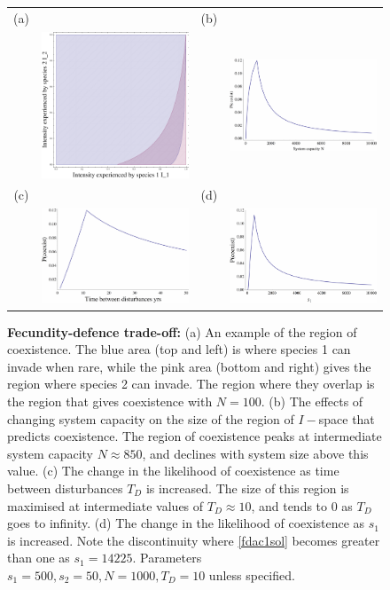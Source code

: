 \documentclass[preprint,10pt,reqno]{amsart}
\begin{document}
\begin{figure}[htbp]
\begin{tabular}{cccc}
(a)&&(b)&\\
&\includegraphics[width=2in]{fdtotdis10.pdf}&&\includegraphics[width=2in]{fdtointwN.pdf} \\
(c)&&(d)&\\
&\includegraphics[width=2in]{fdtointwTd.pdf}&&\includegraphics[width=2in]{fdtointws1.pdf}
\end{tabular}
\caption{\textbf{Fecundity-defence trade-off:} (a) An example of the region of coexistence. The blue area (top and left) is where species 1 can invade when rare, while the pink area (bottom and right) gives the region where species 2 can invade. The region where they overlap is the region that gives coexistence with $N=100$. (b) The effects of changing system capacity on the size of the region of $I-$space that predicts coexistence. The region of coexistence peaks at intermediate system capacity $N\approx 850$, and declines with system size above this value. (c) The change in the likelihood of coexistence as time between disturbances $T_D$ is increased. The size of this region is maximised at intermediate values of $T_D \approx 10$, and tends to 0 as $T_D$ goes to infinity. (d) The change in the likelihood of coexistence as $s_1$ is increased. Note the discontinuity where \eqref{fdac1sol} becomes greater than one as $s_1=14225$.  Parameters $s_1=500,s_2=50,N=1000,T_D=10$ unless specified.}
\label{fd}
\end{figure}
\end{document}

